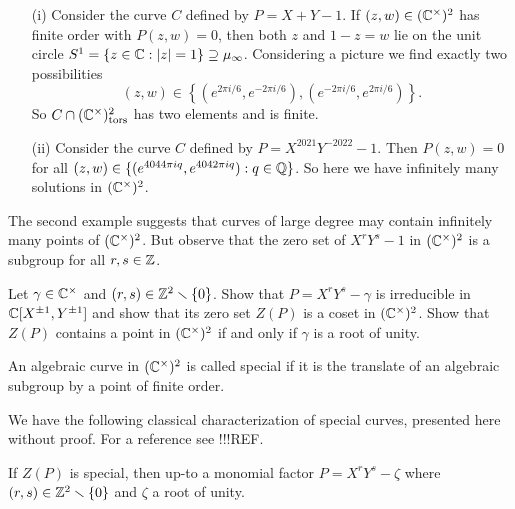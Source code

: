 \begin{example}
  \begin{itemize}
  \item [(i)] Consider the curve $C$ defined by $P = X+Y-1$. If
    $(z,w)\in({\mathbb{C}}^\times)^2$ has finite order with $P(z,w)=0$, then
    both $z$ and $1-z=w$ lie on the unit circle $S^1= \{z\in{\mathbb{C}} :
    |z|=1\}\supseteq\mu_\infty$. 
    Considering a picture we find exactly two possibilities    
    $$
    (z,w) \in \left\{ (e^{2\pi i/6},e^{-2\pi i/6}),(e^{-2\pi
        i/6},e^{2\pi i/6})\right\}.
    $$
    So $C\cap ({\mathbb{C}}^\times)^2_{\mathrm{tors}}$ has two elements and is
    finite.

  \item[(ii)] Consider the curve $C$ defined by
    $P=X^{2021}Y^{-2022}-1$. Then
    $P(z,w)=0$ for all $(z,w)\in \{(e^{4044\pi iq},e^{4042\pi i
      q}) : q\in{\mathbb{Q}}\}$.
    So here we have infinitely many solutions in $({\mathbb{C}}^\times)^2$.
  \end{itemize}
\end{example}

The second example suggests that curves of large degree may contain
infinitely many points of $({\mathbb{C}}^\times)^2$. But observe that the zero
set of $X^{r}Y^{s}-1$ in $({\mathbb{C}}^\times)^2$ is a subgroup for all
$r,s\in{\mathbb{Z}}$. 

\begin{exercise}
  \label{exer:infinitemany}
  Let $\gamma\in {\mathbb{C}}^\times$ and $(r,s)\in{\mathbb{Z}}^2\smallsetminus
  \{0\}$. Show that $P=X^rY^s-\gamma$ is irreducible in ${\mathbb{C}}[X^{\pm
    1},Y^{\pm 1}]$ and show that its zero set $Z(P)$ is a coset in
  $({\mathbb{C}}^\times)^2$. Show that $Z(P)$ contains a point in
  $({\mathbb{C}}^\times)^2$ if and only if $\gamma$ is a root of unity. 
\end{exercise}

\begin{definition}
  An algebraic curve in $({\mathbb{C}}^\times)^2$
  is called special if it is the translate of an algebraic subgroup by
  a point of finite order. 
\end{definition}

We have the following classical characterization of special curves,
presented here without proof. For a reference see !!!REF. 

\begin{lemma}
  \label{lem:specialGm2}
  If $Z(P)$ is special, then up-to a monomial factor
  $P=X^rY^s-\zeta$ where $(r,s)\in{\mathbb{Z}}^2\smallsetminus\{0\}$
  and $\zeta$ a root of unity. 
\end{lemma}


